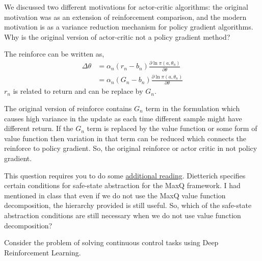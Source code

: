 \documentclass[solution,addpoints,12pt]{exam}
\begin{document}
\begin{questions}
\question[3] We discussed two different motivations for actor-critic algorithms: the original motivation was as an extension of reinforcement comparison, and the modern motivation is as a variance reduction mechanism for policy gradient algorithms. Why is the original version
of actor-critic not a policy gradient method?
\begin{solution}
The reinforce can be written as,
\begin{equation}
\begin{aligned}
\Delta \theta &= \alpha_n (r_n - b_n) \frac{\partial \ln \pi(a,\theta_n)}{\partial \theta}\\
&= \alpha_n (G_n - b_n) \frac{\partial \ln \pi(a,\theta_n)}{\partial \theta}
\end{aligned}
\end{equation}
$r_n$ is related to return and can be replace by $G_n$.

The original version of reinforce contains $G_n$ term in  the formulation  which causes high variance in the update as each time different sample might have different return. 
If the $G_n$ term is replaced by the value function or some form of value function then variation in that term can be reduced which connects the reinforce to policy gradient. So, the original reinforce or actor critic in not policy gradient.
\end{solution}


\question[4]
This question requires you to do some \href{https://arxiv.org/abs/cs/9905014}{additional reading}.  Dietterich specifies certain conditions for safe-state abstraction for the MaxQ framework.  I had mentioned in class that even if we do not use the MaxQ value function decomposition, the hierarchy provided is still useful.  So, which of the safe-state abstraction conditions are still necessary when we do not use value function decomposition?
\begin{solution}

\end{solution}

\question[3] Consider the problem of solving continuous control tasks using Deep Reinforcement Learning.

\end{questions}
\end{document}
